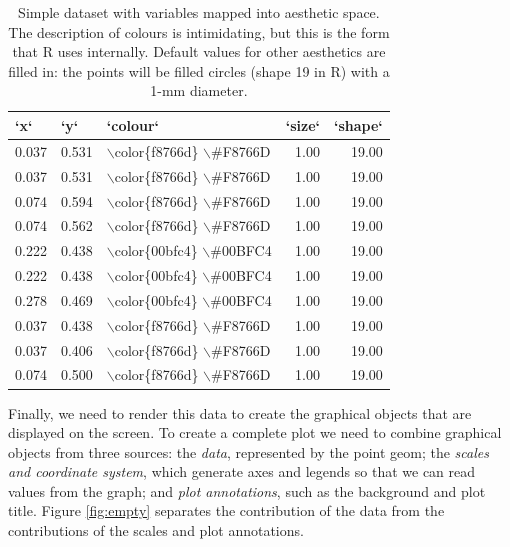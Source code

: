 \begin{table}[ht]
\centering
\begin{tabular}{lllrr}
  \hline
`x` & `y` & `colour` & `size` & `shape` \\ 
  \hline
0.037 & 0.531 & $\backslash$color\{f8766d\} $\backslash$\#F8766D & 1.00 & 19.00 \\ 
  0.037 & 0.531 & $\backslash$color\{f8766d\} $\backslash$\#F8766D & 1.00 & 19.00 \\ 
  0.074 & 0.594 & $\backslash$color\{f8766d\} $\backslash$\#F8766D & 1.00 & 19.00 \\ 
  0.074 & 0.562 & $\backslash$color\{f8766d\} $\backslash$\#F8766D & 1.00 & 19.00 \\ 
  0.222 & 0.438 & $\backslash$color\{00bfc4\} $\backslash$\#00BFC4 & 1.00 & 19.00 \\ 
  0.222 & 0.438 & $\backslash$color\{00bfc4\} $\backslash$\#00BFC4 & 1.00 & 19.00 \\ 
  0.278 & 0.469 & $\backslash$color\{00bfc4\} $\backslash$\#00BFC4 & 1.00 & 19.00 \\ 
  0.037 & 0.438 & $\backslash$color\{f8766d\} $\backslash$\#F8766D & 1.00 & 19.00 \\ 
  0.037 & 0.406 & $\backslash$color\{f8766d\} $\backslash$\#F8766D & 1.00 & 19.00 \\ 
  0.074 & 0.500 & $\backslash$color\{f8766d\} $\backslash$\#F8766D & 1.00 & 19.00 \\ 
   \hline
\end{tabular}
\caption{Simple dataset with variables mapped into aesthetic space. The description of colours is intimidating, but this is the form that R uses internally. Default values for other aesthetics are filled in: the points will be filled circles (shape 19 in R) with a 1-mm diameter.} 
\label{tbl:scaled}
\end{table}

Finally, we need to render this data to create the graphical objects
that are displayed on the screen. To create a complete plot we need to
combine graphical objects from three sources: the \emph{data},
represented by the point geom; the \emph{scales and coordinate system},
which generate axes and legends so that we can read values from the
graph; and \emph{plot annotations}, such as the background and plot
title. Figure \ref{fig:empty} separates the contribution of the data
from the contributions of the scales and plot annotations.

